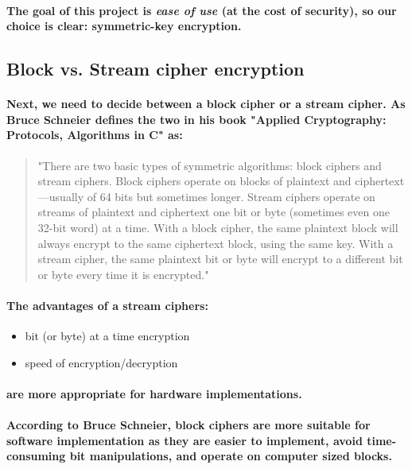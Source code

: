 \paragraph{The goal of this project is \emph{ease of use} (at the cost of security), so our choice is clear: symmetric-key encryption.}

\subsection{Block vs. Stream cipher encryption}
\paragraph{Next, we need to decide between a block cipher or a stream cipher. As Bruce Schneier defines the two in his book "Applied Cryptography: Protocols, Algorithms in C" as:}

\begin{quote}
"There are two basic types of symmetric algorithms: block ciphers and stream ciphers. Block ciphers
operate on blocks of plaintext and ciphertext—usually of 64 bits but sometimes longer. Stream
ciphers operate on streams of plaintext and ciphertext one bit or byte (sometimes even one 32-bit
word) at a time. With a block cipher, the same plaintext block will always encrypt to the same
ciphertext block, using the same key. With a stream cipher, the same plaintext bit or byte will
encrypt to a different bit or byte every time it is encrypted." \cite[p. 12]{Schneier}
\end{quote}
\paragraph{The advantages of a stream ciphers:}

\begin{itemize}
\item bit (or byte) at a time encryption
\item speed of encryption/decryption
\end{itemize}

\paragraph{are more appropriate for hardware implementations.}

\paragraph{According to Bruce Schneier, block ciphers are more suitable for software implementation as they are easier to implement, avoid time-consuming bit manipulations, and operate on computer sized blocks.}\cite[p. 172]{Schneier}

